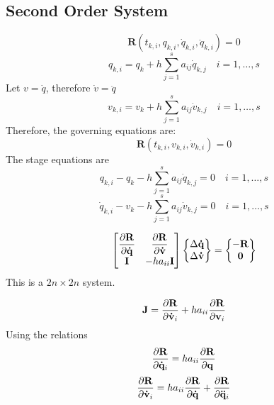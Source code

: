 \documentclass[pdftex,11pt,letter]{article}
\begin{document}
\subsection{Second Order System}

\begin{equation}
  \mathbf{R}\left(t_{k,i}, q_{k,i}, \dot{q}_{k,i}, \ddot{q}_{k,i}\right) = 0
\end{equation}
\begin{equation}
  q_{k,i} = q_{k} + h \sum_{j=1}^s a_{ij} \dot{q}_{k,j} \quad i = 1,\ldots,s 
\end{equation}
Let $v=\dot{q}$, therefore $\dot{v}=\ddot{q}$
\begin{equation}
  v_{k,i} = v_{k} + h \sum_{j=1}^s a_{ij} \dot{v}_{k,j} \quad i = 1,\ldots,s 
\end{equation}
Therefore, the governing equations are:
\begin{equation}
  \mathbf{R}\left(t_{k,i}, v_{k,i}, \dot{v}_{k,i}\right) = 0
\end{equation}
The stage equations are
\begin{equation}
  q_{k,i} - q_{k} - h \sum_{j=1}^s a_{ij} \dot{q}_{k,j} = 0 \quad i = 1,\ldots,s 
\end{equation}
\begin{equation}
  \dot{q}_{k,i} - v_{k} - h \sum_{j=1}^s a_{ij} \dot{v}_{k,j} = 0 \quad i = 1,\ldots,s 
\end{equation}

\begin{equation}
  \begin{bmatrix}
    \mathbf{\dfrac{\partial R}{\partial \dot{q}}} & \mathbf{\dfrac{\partial R}{\partial \dot{v}}} \\
    \mathbf{I} & -h a_{ii}\mathbf{I}\\
  \end{bmatrix}   \begin{Bmatrix}
    \Delta{\mathbf{\dot{q}}} \\
    \Delta{\mathbf{\dot{v}}} \\
  \end{Bmatrix} =    \begin{Bmatrix}
    -\mathbf{R} \\ \mathbf{0}
  \end{Bmatrix}
\end{equation}
This is a $2n \times 2n$ system.

\begin{equation}
  \mathbf{J} = \dfrac{\partial \mathbf{R}}{\partial \mathbf{\dot{v}}_{i}} + h a_{ii}
  \dfrac{\partial \mathbf{R}}{\partial \mathbf{v}_{i}}
\end{equation}
Using the relations
\begin{equation}
  \dfrac{\partial \mathbf{R}}{\partial \mathbf{\dot{q}}_{i}} = h a_{ii} \dfrac{\partial \mathbf{R}}{\partial \mathbf{{q}}}
\end{equation}
\begin{equation}
  \dfrac{\partial \mathbf{R}}{\partial \mathbf{\dot{v}}_{i}} = h a_{ii} \dfrac{\partial \mathbf{R}}{\partial \mathbf{\dot{q}}} + \dfrac{\partial \mathbf{R}}{\partial \mathbf{\ddot{q}}_{i}}
\end{equation}
\end{document}

